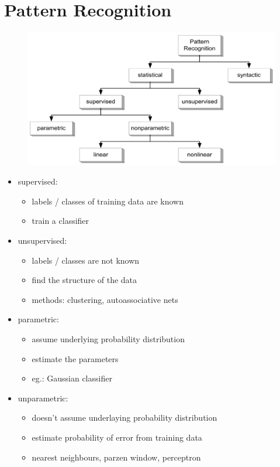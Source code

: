 \section{Pattern Recognition}
\label{sect:pattern-recognition}
\begin{figure}[h]
	\includegraphics[scale=0.3]{pattern-recognition-partitioning}
\end{figure}

\begin{itemize}
	\item supervised:
		\begin{itemize}
			\item labels / classes of training data are known
			\item train a classifier
		\end{itemize}
	\item unsupervised:
		\begin{itemize}
			\item labels / classes are not known
			\item find the structure of the data
			\item methods: clustering, autoassociative nets
		\end{itemize}
	\item parametric:
		\begin{itemize}
			\item assume underlying probability distribution
			\item estimate the parameters
			\item eg.: Gaussian classifier
		\end{itemize}
	\item unparametric:
		\begin{itemize}
			\item doesn't assume underlaying probability distribution
			\item estimate probability of error from training data
			\item nearest neighbours, parzen window, perceptron
		\end{itemize}
\end{itemize}


